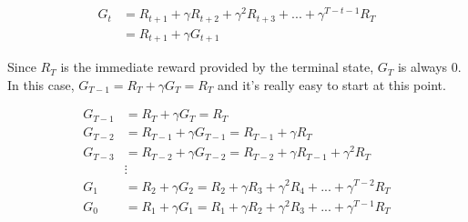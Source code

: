 \begin{align*}
    G_t &= R_{t+1} + \gamma R_{t+2} + \gamma ^2 R_{t+3} + ... + \gamma ^{T-t-1} R_{T} \\
    &= R_{t+1} + \gamma G_{t+1}
\end{align*}

Since $R_T$ is the immediate reward provided by the terminal state, $G_T$ is always 0. In this case, $G_{T-1} = R_T + \gamma G_T = R_T$ and it's really easy to start at this point.

\begin{align*}
    G_{T-1} &= R_T + \gamma G_T = R_T\\
    G_{T-2} &= R_{T-1} + \gamma G_{T-1} = R_{T-1} + \gamma R_T\\
    G_{T-3} &= R_{T-2} + \gamma G_{T-2} = R_{T-2} + \gamma R_{T-1} + \gamma ^2 R_T\\
    &\vdots\\
    G_1 &= R_2 + \gamma G_2 = R_2 + \gamma R_3 + \gamma ^2 R_4 + ... + \gamma ^{T-2} R_T\\
    G_0 &= R_1 + \gamma G_1 = R_1 + \gamma R_2 + \gamma ^2 R_3 + ... + \gamma ^{T-1} R_T
\end{align*}

